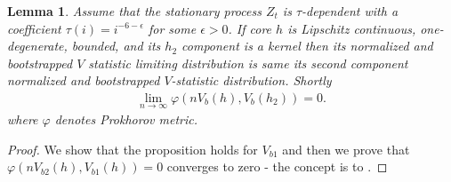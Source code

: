 \documentclass{article} %
\newtheorem{lemma}{Lemma}
\begin{document}
\begin{lemma}
\label{lem:equivBoot}
Assume that the stationary process $Z_t$ is $\tau$-dependent with a coefficient $\tau(i) = i^{-6-\epsilon}$ for some $\epsilon>0$. If core $h$ is Lipschitz continuous, one-degenerate, bounded, and its $h_2$ component is a kernel then its normalized and bootstrapped $V$ statistic limiting distribution is same its second component normalized and bootstrapped $V$-statistic distribution. Shortly
\begin{align}
\lim_{n \to \infty} \varphi( n V_b(h), V_b(h_2)) =0. 
\end{align}
where $\varphi$ denotes Prokhorov metric. 
\end{lemma}
\begin{proof}
We show that the proposition holds for $V_{b1}$ and then we prove that $\varphi( n V_{b2}(h), V_{b1}(h)) =0$ converges to zero - the concept is to \cite{leucht_dependent_2013}.   


\end{proof}
\end{document}
